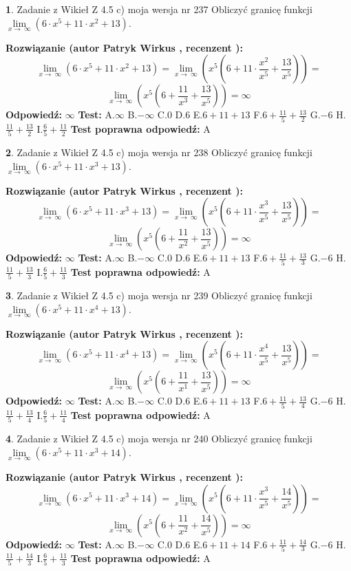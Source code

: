 \documentclass[12pt, a4paper]{article}
\theoremstyle{definition} %
\newtheorem{zad}{}
\newcommand{\zadStart}[1]{\begin{zad}#1\newline}
\newcommand{\zadStop}{\end{zad}}
\newcommand{\rozwStart}[2]{\noindent \textbf{Rozwiązanie (autor #1 , recenzent #2): }\newline}
\newcommand{\rozwStop}{\newline}
\newcommand{\odpStart}{\noindent \textbf{Odpowiedź:}\newline}
\newcommand{\odpStop}{\newline}
\newcommand{\testStart}{\noindent \textbf{Test:}\newline}
\newcommand{\testStop}{\newline}
\newcommand{\kluczStart}{\noindent \textbf{Test poprawna odpowiedź:}\newline}
\newcommand{\kluczStop}{\newline}
\begin{document}
\zadStart{Zadanie z Wikieł Z 4.5 c) moja wersja nr 237}
Obliczyć granicę funkcji  $\lim\limits_{x\to\ \infty}(6 \cdot x^{5}+11 \cdot x^{2}+13)$.
\zadStop
\rozwStart{Patryk Wirkus}{}
$$\lim\limits_{x\to\ \infty}(6 \cdot x^{5}+11 \cdot x^{2}+13) = \lim\limits_{x\to\ \infty}(x^{5}(6 +11 \cdot \frac{x^{2}}{x^{5}}+\frac{13}{x^{5}})) =$$ $$\lim\limits_{x\to\ \infty}(x^{5}(6 +\frac{11}{x^{3}}+\frac{13}{x^{5}})) =\infty$$
\rozwStop
\odpStart
$\infty$
\odpStop
\testStart
A.$\infty$ B.$-\infty$ C.$0$ D.$6$ E.$6 + 11 + 13$
F.$6+\frac{11}{5}+\frac{13}{2}$ G.$-6$
H.$\frac{11}{5}+\frac{13}{2}$
I.$\frac{6}{5}+\frac{11}{2}$
\testStop
\kluczStart
A
\kluczStop



\zadStart{Zadanie z Wikieł Z 4.5 c) moja wersja nr 238}
Obliczyć granicę funkcji  $\lim\limits_{x\to\ \infty}(6 \cdot x^{5}+11 \cdot x^{3}+13)$.
\zadStop
\rozwStart{Patryk Wirkus}{}
$$\lim\limits_{x\to\ \infty}(6 \cdot x^{5}+11 \cdot x^{3}+13) = \lim\limits_{x\to\ \infty}(x^{5}(6 +11 \cdot \frac{x^{3}}{x^{5}}+\frac{13}{x^{5}})) =$$ $$\lim\limits_{x\to\ \infty}(x^{5}(6 +\frac{11}{x^{2}}+\frac{13}{x^{5}})) =\infty$$
\rozwStop
\odpStart
$\infty$
\odpStop
\testStart
A.$\infty$ B.$-\infty$ C.$0$ D.$6$ E.$6 + 11 + 13$
F.$6+\frac{11}{5}+\frac{13}{3}$ G.$-6$
H.$\frac{11}{5}+\frac{13}{3}$
I.$\frac{6}{5}+\frac{11}{3}$
\testStop
\kluczStart
A
\kluczStop



\zadStart{Zadanie z Wikieł Z 4.5 c) moja wersja nr 239}
Obliczyć granicę funkcji  $\lim\limits_{x\to\ \infty}(6 \cdot x^{5}+11 \cdot x^{4}+13)$.
\zadStop
\rozwStart{Patryk Wirkus}{}
$$\lim\limits_{x\to\ \infty}(6 \cdot x^{5}+11 \cdot x^{4}+13) = \lim\limits_{x\to\ \infty}(x^{5}(6 +11 \cdot \frac{x^{4}}{x^{5}}+\frac{13}{x^{5}})) =$$ $$\lim\limits_{x\to\ \infty}(x^{5}(6 +\frac{11}{x^{1}}+\frac{13}{x^{5}})) =\infty$$
\rozwStop
\odpStart
$\infty$
\odpStop
\testStart
A.$\infty$ B.$-\infty$ C.$0$ D.$6$ E.$6 + 11 + 13$
F.$6+\frac{11}{5}+\frac{13}{4}$ G.$-6$
H.$\frac{11}{5}+\frac{13}{4}$
I.$\frac{6}{5}+\frac{11}{4}$
\testStop
\kluczStart
A
\kluczStop



\zadStart{Zadanie z Wikieł Z 4.5 c) moja wersja nr 240}
Obliczyć granicę funkcji  $\lim\limits_{x\to\ \infty}(6 \cdot x^{5}+11 \cdot x^{3}+14)$.
\zadStop
\rozwStart{Patryk Wirkus}{}
$$\lim\limits_{x\to\ \infty}(6 \cdot x^{5}+11 \cdot x^{3}+14) = \lim\limits_{x\to\ \infty}(x^{5}(6 +11 \cdot \frac{x^{3}}{x^{5}}+\frac{14}{x^{5}})) =$$ $$\lim\limits_{x\to\ \infty}(x^{5}(6 +\frac{11}{x^{2}}+\frac{14}{x^{5}})) =\infty$$
\rozwStop
\odpStart
$\infty$
\odpStop
\testStart
A.$\infty$ B.$-\infty$ C.$0$ D.$6$ E.$6 + 11 + 14$
F.$6+\frac{11}{5}+\frac{14}{3}$ G.$-6$
H.$\frac{11}{5}+\frac{14}{3}$
I.$\frac{6}{5}+\frac{11}{3}$
\testStop
\kluczStart
A
\kluczStop
\end{document}
